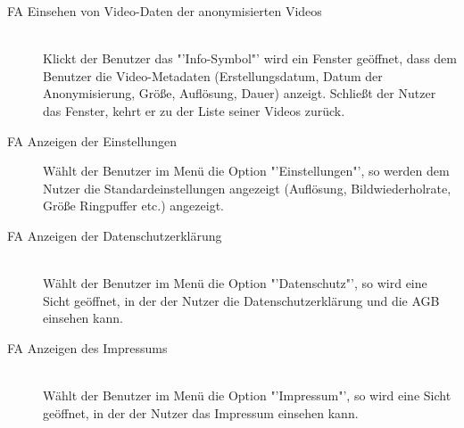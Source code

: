 \begin{description}
\item[FA Einsehen von Video-Daten der anonymisierten Videos] \hfill \\
Klickt der Benutzer das "'Info-Symbol"' wird ein Fenster geöffnet, dass dem Benutzer die Video-Metadaten (Erstellungsdatum, Datum der Anonymisierung, Größe, Auflösung, Dauer) anzeigt. Schließt der Nutzer das Fenster, kehrt er zu der Liste seiner Videos zurück.

\item[FA Anzeigen der Einstellungen]
Wählt der Benutzer im Menü die Option "'Einstellungen"', so werden dem Nutzer die Standardeinstellungen angezeigt (Auflösung, Bildwiederholrate, Größe Ringpuffer etc.) angezeigt.

\item[FA Anzeigen der Datenschutzerklärung] \hfill \\
Wählt der Benutzer im Menü die Option "'Datenschutz"', so wird eine Sicht geöffnet, in der der Nutzer die Datenschutzerklärung und die AGB einsehen kann.

\item[FA Anzeigen des Impressums] \hfill \\
Wählt der Benutzer im Menü die Option "'Impressum"', so wird eine Sicht geöffnet, in der der Nutzer das Impressum einsehen kann.

\end{description}

